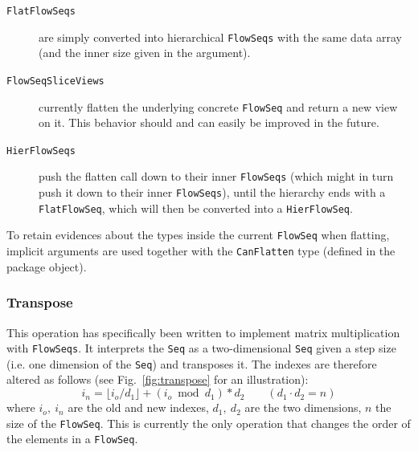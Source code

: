 \documentclass[runningheads,a4paper,fleqn]{llncs}
\begin{document}
\begin{description}
\item[\texttt{FlatFlowSeqs}] are simply converted into hierarchical
  \texttt{FlowSeqs} with the same data array (and the inner size given in the
  argument).
\item[\texttt{FlowSeqSliceViews}] currently flatten the underlying
  concrete \texttt{FlowSeq} and return a new view on it. This behavior
  should and can easily be improved in the future.
\item[\texttt{HierFlowSeqs}] push the flatten call down to their
  inner \texttt{FlowSeqs} (which might in turn push it down to their
  inner \texttt{FlowSeqs}), until the hierarchy ends with a
  \texttt{FlatFlowSeq}, which will then be converted into a
  \texttt{HierFlowSeq}.
\end{description}

To retain evidences about the types inside the current \texttt{FlowSeq} when
flatting, implicit arguments are used together with the
\texttt{CanFlatten} type (defined in the package object).

\subsubsection{Transpose}
This operation has specifically been written to implement matrix
multiplication with \texttt{FlowSeqs}. It interprets the \texttt{Seq}
as a two-dimensional \texttt{Seq} given a step size (i.e. one
dimension of the \texttt{Seq}) and transposes it. The indexes are
therefore altered as follows (see Fig.~\ref{fig:transpose} for an
illustration): 
\[ i_n = \lfloor i_o / d_1 \rfloor + (i_o \bmod d_1) * d_2 \qquad (d_1
\cdot d_2 = n)\]
where $i_o,\ i_n$ are the old and new indexes, $d_1,\ d_2$ are the two
dimensions, $n$ the size of the \texttt{FlowSeq}. This is currently the only
operation that changes the order of the elements in a \texttt{FlowSeq}.
\end{document}
